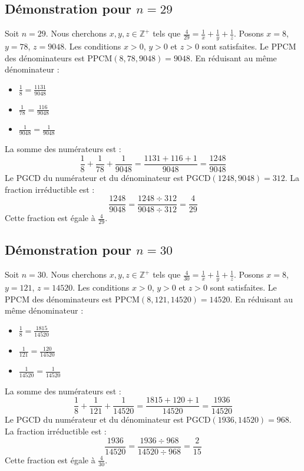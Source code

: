 \documentclass[11pt,a4paper]{article}
\begin{document}
\subsection{Démonstration pour $n = 29$}
Soit $n = 29$. Nous cherchons $x, y, z \in \mathbb{Z}^{+}$ tels que $\frac{4}{29} = \frac{1}{x} + \frac{1}{y} + \frac{1}{z}$.
Posons $x = 8$, $y = 78$, $z = 9048$.
Les conditions $x > 0$, $y > 0$ et $z > 0$ sont satisfaites.
Le PPCM des dénominateurs est $\text{PPCM}(8, 78, 9048) = 9048$.
En réduisant au même dénominateur :
\begin{itemize}
    \item $\frac{1}{8} = \frac{1131}{9048}$
    \item $\frac{1}{78} = \frac{116}{9048}$
    \item $\frac{1}{9048} = \frac{1}{9048}$
\end{itemize}
La somme des numérateurs est :
$$ \frac{1}{8} + \frac{1}{78} + \frac{1}{9048} = \frac{1131 + 116 + 1}{9048} = \frac{1248}{9048} $$
Le PGCD du numérateur et du dénominateur est $\text{PGCD}(1248, 9048) = 312$.
La fraction irréductible est :
$$ \frac{1248}{9048} = \frac{1248 \div 312}{9048 \div 312} = \frac{4}{29} $$
Cette fraction est égale à $\frac{4}{29}$.

\subsection{Démonstration pour $n = 30$}
Soit $n = 30$. Nous cherchons $x, y, z \in \mathbb{Z}^{+}$ tels que $\frac{4}{30} = \frac{1}{x} + \frac{1}{y} + \frac{1}{z}$.
Posons $x = 8$, $y = 121$, $z = 14520$.
Les conditions $x > 0$, $y > 0$ et $z > 0$ sont satisfaites.
Le PPCM des dénominateurs est $\text{PPCM}(8, 121, 14520) = 14520$.
En réduisant au même dénominateur :
\begin{itemize}
    \item $\frac{1}{8} = \frac{1815}{14520}$
    \item $\frac{1}{121} = \frac{120}{14520}$
    \item $\frac{1}{14520} = \frac{1}{14520}$
\end{itemize}
La somme des numérateurs est :
$$ \frac{1}{8} + \frac{1}{121} + \frac{1}{14520} = \frac{1815 + 120 + 1}{14520} = \frac{1936}{14520} $$
Le PGCD du numérateur et du dénominateur est $\text{PGCD}(1936, 14520) = 968$.
La fraction irréductible est :
$$ \frac{1936}{14520} = \frac{1936 \div 968}{14520 \div 968} = \frac{2}{15} $$
Cette fraction est égale à $\frac{4}{30}$.
\end{document}

